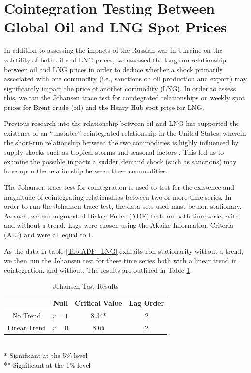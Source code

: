 \section{Cointegration Testing Between Global Oil and LNG Spot Prices}

In addition to assessing the impacts of the Russian-war in Ukraine on the volatility of both oil and LNG
prices, we assessed the long run relationship between oil and LNG prices in order to deduce whether a
shock primarily associated with one commodity (i.e., sanctions on oil production and export) may
significantly impact the price of another commodity (LNG). In order to assess this, we ran the Johansen trace
test for cointegrated relationships on weekly spot prices for Brent crude (oil) and the Henry Hub spot price
for LNG.
\medskip

Previous research into the relationship between oil and LNG has supported the existence of an “unstable”
cointegrated relationship in the United States, wherein the short-run relationship between the two
commodities is highly influenced by supply shocks such as tropical storms and seasonal factors \cite{matt1}.
This led us to examine the possible impacts a sudden demand shock (such as sanctions)
may have upon the relationship between these commodities.
\medskip

The Johansen trace test for cointegration is used to test for the existence and magnitude of cointegrating
relationships between two or more time-series. In order to run the Johansen trace test, the data sets used
must be non-stationary. As such, we ran augmented Dickey-Fuller (ADF) tests on both time series with and
without a trend. Lags were chosen using the Akaike Information Criteria (AIC) and were all equal to 1. 
\medskip

As the data in table \ref{Tab:ADF_LNG} exhibits non-stationarity without a trend, we then run the Johansen test for these time series both with a linear trend in cointegration, and without. The results are outlined in Table \ref{Tab:Johansen}.

\begin{table}[H]
\centering
\caption{Johansen Test Results}
\begin{tabular}{c|ccc}
            & Null & Critical Value & Lag Order\\\hline\hline
No Trend & $r = 1$ & 8.34* & 2\\\hline
Linear Trend & $r = 0$ & 8.66 & 2
\end{tabular}\label{Tab:Johansen}
\\
* Significant at the 5\% level\\
** Significant at the 1\% level
\end{table}

